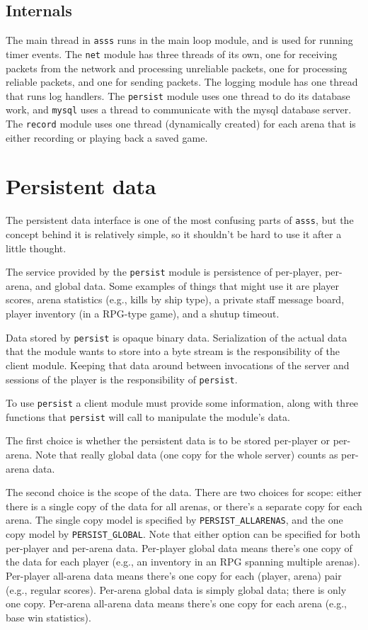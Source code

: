 \documentclass{article}
\newcommand{\asss}{\texttt{asss}}
\begin{document}
\subsection{Internals}

The main thread in \asss{} runs in the main loop module, and is used for
running timer events. The \verb/net/ module has three threads of its
own, one for receiving packets from the network and processing
unreliable packets, one for processing reliable packets, and one for
sending packets. The logging module has one thread that runs log
handlers. The \verb/persist/ module uses one thread to do its database
work, and \verb/mysql/ uses a thread to communicate with the mysql
database server. The \verb/record/ module uses one thread (dynamically
created) for each arena that is either recording or playing back a saved
game.


\section{Persistent data}

The persistent data interface is one of the most confusing parts of
\asss{}, but the concept behind it is relatively simple, so it shouldn't
be hard to use it after a little thought.

The service provided by the \verb/persist/ module is persistence of
per-player, per-arena, and global data. Some examples of things that
might use it are player scores, arena statistics (e.g., kills by ship
type), a private staff message board, player inventory (in a RPG-type
game), and a shutup timeout.

Data stored by \verb/persist/ is opaque binary data. Serialization of
the actual data that the module wants to store into a byte stream is the
responsibility of the client module. Keeping that data around between
invocations of the server and sessions of the player is the
responsibility of \verb/persist/.

To use \verb/persist/ a client module must provide some information,
along with three functions that \verb/persist/ will call to manipulate
the module's data.

The first choice is whether the persistent data is to be stored
per-player or per-arena. Note that really global data (one copy for the
whole server) counts as per-arena data.

The second choice is the scope of the data. There are two choices for
scope: either there is a single copy of the data for all arenas, or
there's a separate copy for each arena. The single copy model is
specified by \verb/PERSIST_ALLARENAS/, and the one copy model by
\verb/PERSIST_GLOBAL/. Note that either option can be specified for both
per-player and per-arena data. Per-player global data means there's one
copy of the data for each player (e.g., an inventory in an RPG spanning
multiple arenas). Per-player all-arena data means there's one copy for
each (player, arena) pair (e.g., regular scores). Per-arena global data
is simply global data; there is only one copy. Per-arena all-arena data
means there's one copy for each arena (e.g., base win statistics).
\end{document}
